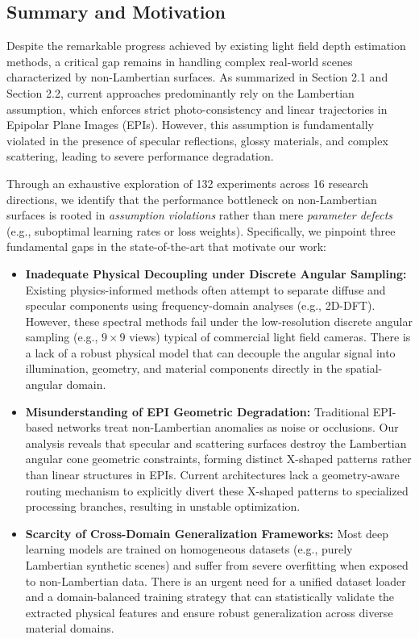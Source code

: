 \documentclass[lettersize,journal]{IEEEtran}
\begin{document}
\subsection{Summary and Motivation}

Despite the remarkable progress achieved by existing light field depth estimation methods, a critical gap remains in handling complex real-world scenes characterized by non-Lambertian surfaces. As summarized in Section 2.1 and Section 2.2, current approaches predominantly rely on the Lambertian assumption, which enforces strict photo-consistency and linear trajectories in Epipolar Plane Images (EPIs). However, this assumption is fundamentally violated in the presence of specular reflections, glossy materials, and complex scattering, leading to severe performance degradation. 

Through an exhaustive exploration of 132 experiments across 16 research directions, we identify that the performance bottleneck on non-Lambertian surfaces is rooted in \textit{assumption violations} rather than mere \textit{parameter defects} (e.g., suboptimal learning rates or loss weights). Specifically, we pinpoint three fundamental gaps in the state-of-the-art that motivate our work:

\begin{itemize}
    \item \textbf{Inadequate Physical Decoupling under Discrete Angular Sampling:} Existing physics-informed methods often attempt to separate diffuse and specular components using frequency-domain analyses (e.g., 2D-DFT). However, these spectral methods fail under the low-resolution discrete angular sampling (e.g., $9 \times 9$ views) typical of commercial light field cameras. There is a lack of a robust physical model that can decouple the angular signal into illumination, geometry, and material components directly in the spatial-angular domain.
    \item \textbf{Misunderstanding of EPI Geometric Degradation:} Traditional EPI-based networks treat non-Lambertian anomalies as noise or occlusions. Our analysis reveals that specular and scattering surfaces destroy the Lambertian angular cone geometric constraints, forming distinct X-shaped patterns rather than linear structures in EPIs. Current architectures lack a geometry-aware routing mechanism to explicitly divert these X-shaped patterns to specialized processing branches, resulting in unstable optimization.
    \item \textbf{Scarcity of Cross-Domain Generalization Frameworks:} Most deep learning models are trained on homogeneous datasets (e.g., purely Lambertian synthetic scenes) and suffer from severe overfitting when exposed to non-Lambertian data. There is an urgent need for a unified dataset loader and a domain-balanced training strategy that can statistically validate the extracted physical features and ensure robust generalization across diverse material domains.
\end{itemize}
\end{document}
